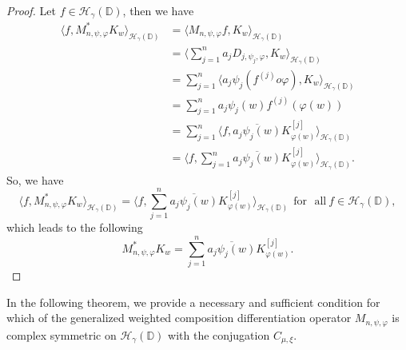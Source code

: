 \documentclass[12pt, reqno]{amsart}
\theoremstyle{definition}
\theoremstyle{remark}
\numberwithin{equation}{section}
\begin{document}
\begin{proof}
	Let $f\in \mathcal{H}_\gamma(\mathbb{D})$, then we have
	\begin{align*}
	\langle f,  M_{n,\psi, \varphi}^*K_w \rangle_{\mathcal{H}_\gamma(\mathbb{D})}&=  \langle  M_{n,\psi, \varphi}f, K_w \rangle_{\mathcal{H}_\gamma(\mathbb{D})}\\
	&=\bigg\langle \sum_{j=1}^{n}a_jD_{j,\psi_j, \varphi} , K_w \bigg\rangle_{\mathcal{H}_\gamma(\mathbb{D})}\\
	&=\sum_{j=1}^{n}\bigg\langle a_j\psi_j(f^{(j)}o \varphi) , K_w \bigg\rangle_{\mathcal{H}_\gamma(\mathbb{D})}\\
	&=\sum_{j=1}^{n}a_j\psi_j(w) f^{(j)}(\varphi(w)) \\
	&=\sum_{j=1}^{n}\bigg\langle  f, \overline{a_j\psi_j(w)}K_{\varphi(w)}^{[j]} \bigg\rangle_{\mathcal{H}_\gamma(\mathbb{D})}\\
		&=\bigg\langle  f, \sum_{j=1}^{n}\overline{a_j\psi_j(w)}K_{\varphi(w)}^{[j]} \bigg\rangle_{\mathcal{H}_\gamma(\mathbb{D})}.
	\end{align*}
	So, we have
	$$\bigg\langle f,  M_{n,\psi, \varphi}^*K_w \bigg\rangle_{\mathcal{H}_\gamma(\mathbb{D})}=\bigg\langle  f,  \sum_{j=1}^{n}\overline{a_j\psi_j(w)}K_{\varphi(w)}^{[j]} \bigg\rangle_{\mathcal{H}_\gamma(\mathbb{D})}~~\mbox{for~ all}~ f\in \mathcal{H}_\gamma(\mathbb{D}),$$
	which leads to the following
$$ M_{n,\psi, \varphi}^*K_w=\sum_{j=1}^{n}\overline{a_j\psi_j(w)}K_{\varphi(w)}^{[j]}.$$
\end{proof}
In the following theorem, we provide a necessary and sufficient condition for which of the generalized weighted  composition differentiation operator $M_{n,\psi, \varphi} $ is complex symmetric on $\mathcal{H}_\gamma(\mathbb{D})$ with the conjugation $C_{\mu, \xi}$. 
\end{document}
